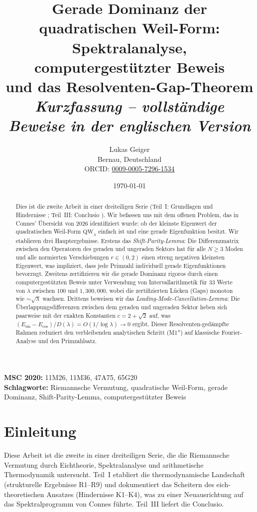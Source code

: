 \documentclass[12pt,a4paper]{article}
\title{Gerade Dominanz der quadratischen Weil-Form:\\ Spektralanalyse, computergestützter Beweis\\ und das Resolventen-Gap-Theorem\\[6pt] \large\textit{Kurzfassung -- vollständige Beweise in der englischen Version}}
\author{Lukas Geiger\\
\small Bernau, Deutschland\\
\small ORCID: \href{https://orcid.org/0009-0005-7296-1534}{0009-0005-7296-1534}}
\date{\today}
\theoremstyle{definition}
\theoremstyle{remark}
\begin{document}
\maketitle

\begin{abstract}
Dies ist die zweite Arbeit in einer dreiteiligen Serie (Teil~I: Grundlagen und Hindernisse \cite{Geiger2026partI}; Teil~III: Conclusio \cite{Geiger2026partIII}). Wir befassen uns mit dem offenen Problem, das in Connes' Übersicht von 2026 \cite{Connes2025} identifiziert wurde: ob der kleinste Eigenwert der quadratischen Weil-Form $\mathrm{QW}_\lambda$ einfach ist und eine gerade Eigenfunktion besitzt. Wir etablieren drei Hauptergebnisse. Erstens das \emph{Shift-Parity-Lemma}: Die Differenzmatrix zwischen den Operatoren des geraden und ungeraden Sektors hat für alle $N \geq 3$ Moden und alle normierten Verschiebungen $r \in (0,2)$ einen streng negativen kleinsten Eigenwert, was impliziert, dass jede Primzahl individuell gerade Eigenfunktionen bevorzugt. Zweitens zertifizieren wir die gerade Dominanz rigoros durch einen computergestützten Beweis unter Verwendung von Intervallarithmetik für $33$ Werte von $\lambda$ zwischen $100$ und $1{,}300{,}000$, wobei die zertifizierten Lücken (Gaps) monoton wie $\sim\!\sqrt{\lambda}$ wachsen. Drittens beweisen wir das \emph{Leading-Mode-Cancellation-Lemma}: Die Überlappungsdifferenzen zwischen dem geraden und ungeraden Sektor heben sich paarweise mit der exakten Konstanten $c = 2 + \sqrt{2}$ auf, was $(E_{\sin} - E_{\cos})/D(\lambda) = O(1/\log\lambda) \to 0$ ergibt. Dieser Resolventen-gedämpfte Rahmen reduziert den verbleibenden analytischen Schritt (M1$''$) auf klassische Fourier-Analyse und den Primzahlsatz.
\end{abstract}

\noindent\textbf{MSC 2020:} 11M26, 11M36, 47A75, 65G20\\
\textbf{Schlagworte:} Riemannsche Vermutung, quadratische Weil-Form, gerade Dominanz, Shift-Parity-Lemma, computergestützter Beweis

\newpage
\tableofcontents

\section{Einleitung}
\label{sec:intro}

Diese Arbeit ist die zweite in einer dreiteiligen Serie, die die Riemannsche Vermutung durch Eichtheorie, Spektralanalyse und arithmetische Thermodynamik untersucht. Teil~I \cite{Geiger2026partI} etabliert die thermodynamische Landschaft (strukturelle Ergebnisse R1--R9) und dokumentiert das Scheitern des eich-theoretischen Ansatzes (Hindernisse K1--K4), was zu einer Neuausrichtung auf das Spektralprogramm von Connes führte. Teil~III \cite{Geiger2026partIII} liefert die Conclusio.
\end{document}
